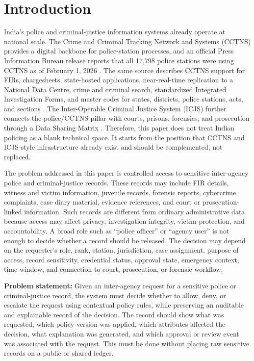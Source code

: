 \section{Introduction}

India's police and criminal-justice information systems already operate at national scale. The Crime and Criminal Tracking Network and Systems (CCTNS) provides a digital backbone for police-station processes, and an official Press Information Bureau release reports that all 17,798 police stations were using CCTNS as of February 1, 2026 \cite{pib_cctns_2026}. The same source describes CCTNS support for FIRs, chargesheets, state-hosted applications, near-real-time replication to a National Data Centre, crime and criminal search, standardized Integrated Investigation Forms, and master codes for states, districts, police stations, acts, and sections \cite{pib_cctns_2026}. The Inter-Operable Criminal Justice System (ICJS) further connects the police/CCTNS pillar with courts, prisons, forensics, and prosecution through a Data Sharing Matrix \cite{mha_icjs_2026}. Therefore, this paper does not treat Indian policing as a blank technical space. It starts from the position that CCTNS and ICJS-style infrastructure already exist and should be complemented, not replaced.

The problem addressed in this paper is controlled access to sensitive inter-agency police and criminal-justice records. These records may include FIR details, witness and victim information, juvenile records, forensic reports, cybercrime complaints, case diary material, evidence references, and court or prosecution-linked information. Such records are different from ordinary administrative data because access may affect privacy, investigation integrity, victim protection, and accountability. A broad role such as ``police officer'' or ``agency user'' is not enough to decide whether a record should be released. The decision may depend on the requester's role, rank, station, jurisdiction, case assignment, purpose of access, record sensitivity, credential status, approval state, emergency context, time window, and connection to court, prosecution, or forensic workflow.

\textbf{Problem statement:} Given an inter-agency request for a sensitive police or criminal-justice record, the system must decide whether to allow, deny, or escalate the request using contextual policy rules, while preserving an auditable and explainable record of the decision. The record should show what was requested, which policy version was applied, which attributes affected the decision, what explanation was generated, and which approval or review event was associated with the request. This must be done without placing raw sensitive records on a public or shared ledger.

